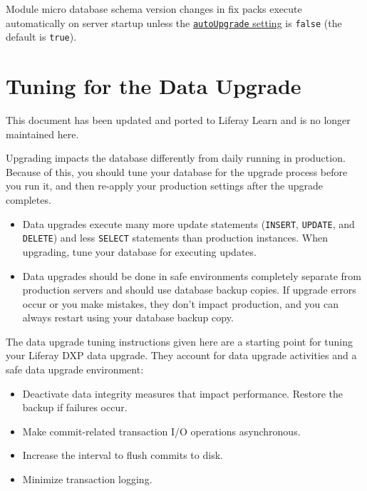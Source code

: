 Module micro database schema version changes in fix packs execute
automatically on server startup unless the
\href{/docs/7-2/deploy/-/knowledge_base/d/configuring-the-data-upgrade}{\texttt{autoUpgrade}
setting} is \texttt{false} (the default is \texttt{true}).

\chapter{Tuning for the Data Upgrade}\label{tuning-for-the-data-upgrade}

{This document has been updated and ported to Liferay Learn and is no
longer maintained here.}

Upgrading impacts the database differently from daily running in
production. Because of this, you should tune your database for the
upgrade process before you run it, and then re-apply your production
settings after the upgrade completes.

\begin{itemize}
\item
  Data upgrades execute many more update statements (\texttt{INSERT},
  \texttt{UPDATE}, and \texttt{DELETE}) and less \texttt{SELECT}
  statements than production instances. When upgrading, tune your
  database for executing updates.
\item
  Data upgrades should be done in safe environments completely separate
  from production servers and should use database backup copies. If
  upgrade errors occur or you make mistakes, they don't impact
  production, and you can always restart using your database backup
  copy.
\end{itemize}

The data upgrade tuning instructions given here are a starting point for
tuning your Liferay DXP data upgrade. They account for data upgrade
activities and a safe data upgrade environment:

\begin{itemize}
\item
  Deactivate data integrity measures that impact performance. Restore
  the backup if failures occur.
\item
  Make commit-related transaction I/O operations asynchronous.
\item
  Increase the interval to flush commits to disk.
\item
  Minimize transaction logging.
\end{itemize}

\noindent\hrulefill

